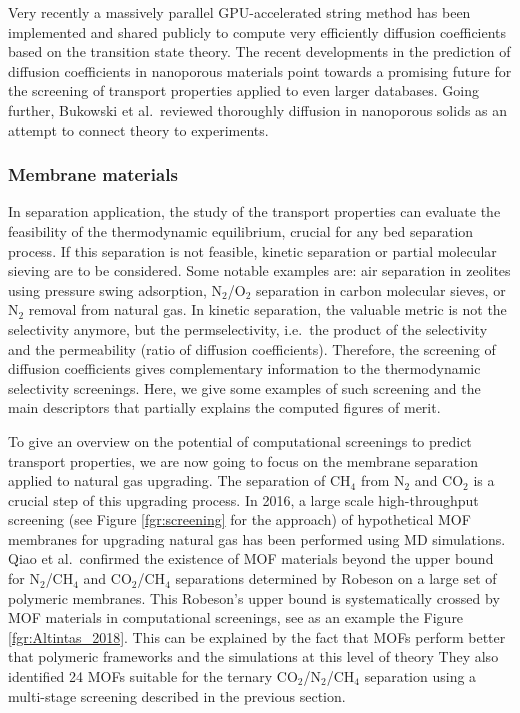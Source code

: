 \documentclass[main.tex]{subfiles}
\begin{document}
Very recently a massively parallel GPU-accelerated string method has been implemented and shared publicly to compute very efficiently diffusion coefficients {based on the transition state theory}.\cite{Zhou_2021} The recent developments in the prediction of diffusion coefficients in nanoporous materials point towards a promising future for the screening of transport properties applied to even larger databases. Going further, Bukowski et al.\ reviewed thoroughly diffusion in nanoporous solids as an attempt to connect theory to experiments.\cite{Bukowski_2021}

\subsubsection{Membrane materials}

In separation application, the study of the transport properties can evaluate the feasibility of the thermodynamic equilibrium, crucial for any bed separation process. If this separation is not feasible, kinetic separation or partial molecular sieving are to be considered. Some notable examples are: air separation in zeolites using pressure swing adsorption,\cite{ruthven1990air} N$_2$/O$_2$ separation in carbon molecular sieves,\cite{Reid_1999} or N$_2$ removal from natural gas.\cite{Wang_2019} In kinetic separation, the valuable metric is not the selectivity anymore, but the permselectivity, i.e.\ the product of the selectivity and the permeability (ratio of diffusion coefficients). Therefore, the screening of diffusion coefficients gives complementary information to the thermodynamic selectivity screenings. Here, we give some examples of such screening and the main descriptors that partially explains the computed figures of merit.

To give an overview on the potential of computational screenings to predict transport properties, we are now going to focus on the membrane separation applied to natural gas upgrading. The separation of CH$_4$ from N$_2$ and CO$_2$ is a crucial step of this upgrading process.
In 2016, a large scale high-throughput screening (see Figure \ref{fgr:screening} for the approach) of hypothetical MOF membranes for upgrading natural gas has been performed using MD simulations.\cite{Qiao_2016} Qiao et al.\ confirmed the existence of MOF materials beyond the upper bound for N$_2$/CH$_4$ and CO$_2$/CH$_4$ separations determined by Robeson on a large set of polymeric membranes.\cite{robeson1991correlation} This Robeson's upper bound is systematically crossed by MOF materials in computational screenings, see as an example the Figure \ref{fgr:Altintas_2018}. This can be explained by the fact that MOFs perform better that polymeric frameworks and the simulations at this level of theory  They also identified 24 MOFs suitable for the ternary CO$_2$/N$_2$/CH$_4$ separation using a multi-stage screening described in the previous section.
\end{document}
